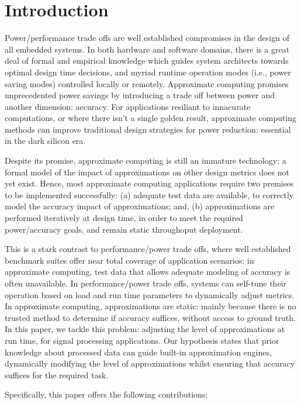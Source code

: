 \section{Introduction}

Power/performance trade offs are well established compromises in the design of all embedded systems. In both hardware and software domains, there is a great deal of formal and empirical knowledge which guides system architects towards optimal design time decisions, and myriad runtime operation modes (i.e., power saving modes) controlled locally or remotely. Approximate computing promises unprecedented power savings by introducing a trade off between power and another dimension: accuracy. For applications resiliant to innacurate computations, or where there isn't a single golden result, approximate computing methods can improve traditional design strategies for power reduction: essential in the dark silicon era.
\par Despite its promise, approximate computing is still an immature technology: a formal model of the impact of approximations on other design metrics does not yet exist. Hence, most approximate computing applications require two premises to be implemented successfully: (a) adequate test data are available, to correctly model the accuracy impact of approximations; and, (b) approximations are performed iteratively at design time, in order to meet the required power/accuracy goals, and remain static throughoput deployment.
\par This is a stark contrast to performance/power trade offs, where well established benchmark suites offer near total coverage of application scenarios: in approximate computing, test data that allows adequate modeling of accuracy is often unavailable. In performance/power trade offs, systems can self-tune their operation based on load and run time parameters to dynamically adjust metrics. In approximate computing, approximations are static: mainly because there is no trusted method to determine if accuracy suffices, without access to ground truth. In this paper, we tackle this problem:  adjusting the level of approximations at run time, for signal processing applications. Our hypothesis states that prior knowledge about processed data can guide built-in approximation engines, dynamically modifying the level of approximations whilst ensuring that accuracy suffices for the required task.
\par Specifically, this paper offers the following contributions:

